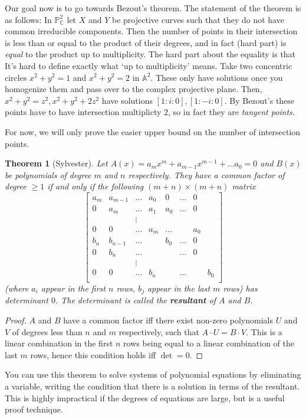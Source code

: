 \documentclass[12pt]{article}
\newcommand{\C}{\mathbb{C}}
\renewcommand{\P}{\mathbb{P}}
\newcommand{\A}{\mathbb{A}}
\newtheorem{theorem}{Theorem}[section]
\begin{document}
    Our goal now is to go towards Bezout's theorem. The statement of the theorem is as follows: In $\P_\C^2$ let $X$ and $Y$ be projective curves such that they do not have common irreducible components. Then the number of points in their intersection is less than or equal to the product of their degrees, and in fact (hard part) is \textit{equal} to the product up to multiplicity. The hard part about the equality is that It's hard to define exactly what `up to multiplicity' means. Take two concentric circles $x^2 + y^2 = 1$ and $x^2 + y^2 = 2$ in $\A^2$. These only have solutions once you homogenize them and pass over to the complex projective plane. Then, $x^2 + y^2 = z^2, x^2 + y^2 + 2z^2$ have solutions $[1:i:0], [1:-i:0]$. By Bezout's these points have to have intersection multiplicty $2$, so in fact they are \textit{tangent points}. \par 
    For now, we will only prove the easier upper bound on the number of intersection points. 
    \begin{theorem}[Sylvester]
        Let $A(x) = a_mx^m + a_{m-1}x^{m-1} + \dots a_0 = 0$ and $B(x)$ be polynomials of degree $m$ and $n$ respectively. They have a common factor of degree $\geq 1$ if and only if the following $(m+n) \times (m+n)$ matrix
        $$\begin{bmatrix}
            a_m & a_{m-1} & \dots & a_0 & 0 & \dots & 0 \\
            0 & a_m & \dots & a_1 & a_0 & \dots & 0 \\
            & & \vdots & & \\
            0 & 0 & \dots & a_m & \dots & & a_0 \\
            b_n & b_{n-1} & \dots & &  b_0 & \dots & 0 \\
            0 & b_n & \dots & & & \dots & 0 \\
            & & \vdots & & \\
            0 & 0 & \dots & b_n & & \dots & & b_0 \\
        \end{bmatrix}$$
        (where $a_i$ appear in the first $n$ rows, $b_j$ appear in the last $m$ rows) has determinant $0$. The determinant is called the \textbf{resultant} of $A$ and $B$. 
    \end{theorem}
    \begin{proof}
        $A$ and $B$ have a common factor iff there exist non-zero polynomials $U$ and $V$ of degrees less than $n$ and $m$ respectively, such that $A\cdot U = B \cdot V$. This is a linear combination in the first $n$ rows being equal to a linear combination of the last $m$ rows, hence this condition holds iff $\det = 0$.  
    \end{proof}
    You can use this theorem to solve systems of polynomial equations by eliminating a variable, writing the condition that there is a solution in terms of the resultant. This is highly impractical if the degrees of equations are large, but is a useful proof technique. 
\end{document}
